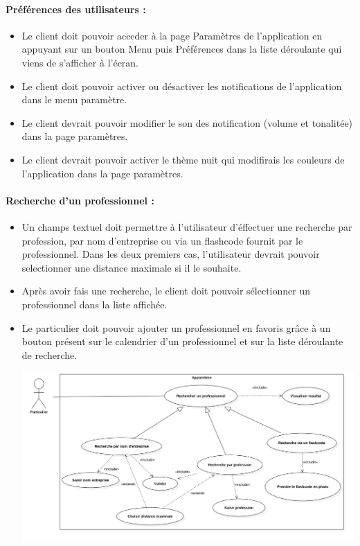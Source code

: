 \documentclass{article}
\begin{document}
\paragraph{Préférences des utilisateurs :}
\begin{itemize}
\item Le client doit pouvoir acceder à la page \og Paramètres \fg{} de l'application en
  appuyant sur un bouton \og Menu \fg{} puis \og Préférences \fg{}
  dans la liste déroulante qui viens de s'afficher à l'écran.
\item Le client doit pouvoir activer ou désactiver les notifications
  de l'application dans le menu paramètre.
\item Le client devrait pouvoir modifier le son des notification
  (volume et tonalitée) dans la page paramètres.
\item Le client devrait pouvoir activer le thème nuit qui modifirais les
  couleurs de l'application dans la page paramètres.
\end{itemize}
\paragraph{Recherche d'un professionnel :}
\begin{itemize}
\item Un champs textuel doit permettre à l'utilisateur d'éffectuer une
  recherche par profession, par nom
  d'entreprise ou via un flashcode fournit par le professionnel. Dans
  les deux premiers cas, l'utilisateur devrait pouvoir selectionner
  une distance maximale si il le souhaite.
\item Après avoir fais une recherche, le client doit pouvoir sélectionner un
  professionnel dans la liste affichée.
\item Le particulier doit pouvoir ajouter un professionnel en favoris grâce
  à un bouton présent sur le calendrier d'un professionnel et sur la
  liste déroulante de recherche.

\includegraphics[scale=0.3]{ShematDiagrammes/useCaseRecherchePro.jpg}

\end{itemize}
\end{document}
